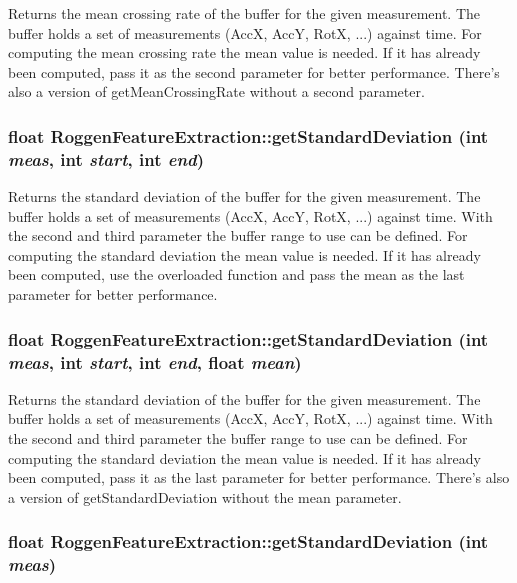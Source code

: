 \label{classRoggenFeatureExtraction_a731a33f8461bc0c4e0466ea628acf6ca}
Returns the mean crossing rate of the buffer for the given measurement. The buffer holds a set of measurements (AccX, AccY, RotX, ...) against time. For computing the mean crossing rate the mean value is needed. If it has already been computed, pass it as the second parameter for better performance. There's also a version of getMeanCrossingRate without a second parameter. \hypertarget{classRoggenFeatureExtraction_aaa92fd1d82e3e6d431701ed5dbf45a07}{
\subsubsection[{getStandardDeviation}]{\setlength{\rightskip}{0pt plus 5cm}float RoggenFeatureExtraction::getStandardDeviation (int {\em meas}, \/  int {\em start}, \/  int {\em end})}}
\label{classRoggenFeatureExtraction_aaa92fd1d82e3e6d431701ed5dbf45a07}
Returns the standard deviation of the buffer for the given measurement. The buffer holds a set of measurements (AccX, AccY, RotX, ...) against time. With the second and third parameter the buffer range to use can be defined. For computing the standard deviation the mean value is needed. If it has already been computed, use the overloaded function and pass the mean as the last parameter for better performance. \hypertarget{classRoggenFeatureExtraction_a6c9c0d0131731c4d2d7d0745a924c2bf}{
\subsubsection[{getStandardDeviation}]{\setlength{\rightskip}{0pt plus 5cm}float RoggenFeatureExtraction::getStandardDeviation (int {\em meas}, \/  int {\em start}, \/  int {\em end}, \/  float {\em mean})}}
\label{classRoggenFeatureExtraction_a6c9c0d0131731c4d2d7d0745a924c2bf}
Returns the standard deviation of the buffer for the given measurement. The buffer holds a set of measurements (AccX, AccY, RotX, ...) against time. With the second and third parameter the buffer range to use can be defined. For computing the standard deviation the mean value is needed. If it has already been computed, pass it as the last parameter for better performance. There's also a version of getStandardDeviation without the mean parameter. \hypertarget{classRoggenFeatureExtraction_abfa00feefa7124b6a8a9e20ca9b9c196}{
\subsubsection[{getStandardDeviation}]{\setlength{\rightskip}{0pt plus 5cm}float RoggenFeatureExtraction::getStandardDeviation (int {\em meas})}}
